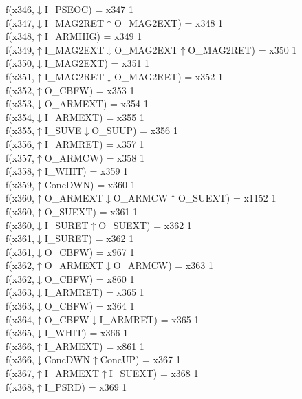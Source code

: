f(x346,$\downarrow$I\_PSEOC) = x347 {1} \\
f(x347,$\downarrow$I\_MAG2RET$\uparrow$O\_MAG2EXT) = x348 {1} \\
f(x348,$\uparrow$I\_ARMHIG) = x349 {1} \\
f(x349,$\uparrow$I\_MAG2EXT$\downarrow$O\_MAG2EXT$\uparrow$O\_MAG2RET) = x350 {1} \\
f(x350,$\downarrow$I\_MAG2EXT) = x351 {1} \\
f(x351,$\uparrow$I\_MAG2RET$\downarrow$O\_MAG2RET) = x352 {1} \\
f(x352,$\uparrow$O\_CBFW) = x353 {1} \\
f(x353,$\downarrow$O\_ARMEXT) = x354 {1} \\
f(x354,$\downarrow$I\_ARMEXT) = x355 {1} \\
f(x355,$\uparrow$I\_SUVE$\downarrow$O\_SUUP) = x356 {1} \\
f(x356,$\uparrow$I\_ARMRET) = x357 {1} \\
f(x357,$\uparrow$O\_ARMCW) = x358 {1} \\
f(x358,$\uparrow$I\_WHIT) = x359 {1} \\
f(x359,$\uparrow$ConcDWN) = x360 {1} \\
f(x360,$\uparrow$O\_ARMEXT$\downarrow$O\_ARMCW$\uparrow$O\_SUEXT) = x1152 {1} \\
f(x360,$\uparrow$O\_SUEXT) = x361 {1} \\
f(x360,$\downarrow$I\_SURET$\uparrow$O\_SUEXT) = x362 {1} \\
f(x361,$\downarrow$I\_SURET) = x362 {1} \\
f(x361,$\downarrow$O\_CBFW) = x967 {1} \\
f(x362,$\uparrow$O\_ARMEXT$\downarrow$O\_ARMCW) = x363 {1} \\
f(x362,$\downarrow$O\_CBFW) = x860 {1} \\
f(x363,$\downarrow$I\_ARMRET) = x365 {1} \\
f(x363,$\downarrow$O\_CBFW) = x364 {1} \\
f(x364,$\uparrow$O\_CBFW$\downarrow$I\_ARMRET) = x365 {1} \\
f(x365,$\downarrow$I\_WHIT) = x366 {1} \\
f(x366,$\uparrow$I\_ARMEXT) = x861 {1} \\
f(x366,$\downarrow$ConcDWN$\uparrow$ConcUP) = x367 {1} \\
f(x367,$\uparrow$I\_ARMEXT$\uparrow$I\_SUEXT) = x368 {1} \\
f(x368,$\uparrow$I\_PSRD) = x369 {1} \\
